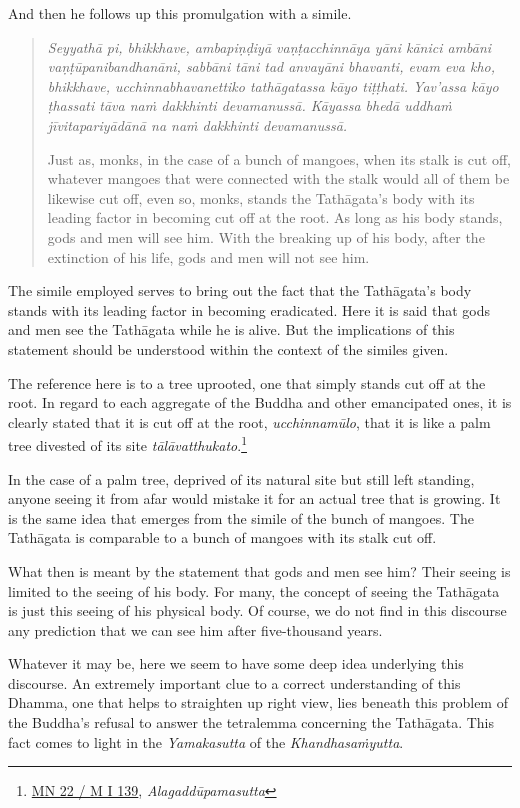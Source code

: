 And then he follows up this promulgation with a simile.

\begin{quote}
\emph{Seyyathā pi, bhikkhave, ambapiṇḍiyā vaṇṭacchinnāya yāni kānici ambāni vaṇṭūpanibandhanāni, sabbāni tāni tad anvayāni bhavanti, evam eva kho, bhikkhave, ucchinnabhavanettiko tathāgatassa kāyo tiṭṭhati. Yav'assa kāyo ṭhassati tāva naṁ dakkhinti devamanussā. Kāyassa bhedā uddhaṁ jīvitapariyādānā na naṁ dakkhinti devamanussā.}

Just as, monks, in the case of a bunch of mangoes, when its stalk is cut off, whatever mangoes that were connected with the stalk would all of them be likewise cut off, even so, monks, stands the Tathāgata's body with its leading factor in becoming cut off at the root. As long as his body stands, gods and men will see him. With the breaking up of his body, after the extinction of his life, gods and men will not see him.
\end{quote}

The simile employed serves to bring out the fact that the Tathāgata's body stands with its leading factor in becoming eradicated. Here it is said that gods and men see the Tathāgata while he is alive. But the implications of this statement should be understood within the context of the similes given.

The reference here is to a tree uprooted, one that simply stands cut off at the root. In regard to each aggregate of the Buddha and other emancipated ones, it is clearly stated that it is cut off at the root, \emph{ucchinnamūlo}, that it is like a palm tree divested of its site \emph{tālāvatthukato}.\footnote{\href{https://suttacentral.net/mn22/pli/ms}{MN 22 / M I 139}, \emph{Alagaddūpamasutta}}

In the case of a palm tree, deprived of its natural site but still left standing, anyone seeing it from afar would mistake it for an actual tree that is growing. It is the same idea that emerges from the simile of the bunch of mangoes. The Tathāgata is comparable to a bunch of mangoes with its stalk cut off.

What then is meant by the statement that gods and men see him? Their seeing is limited to the seeing of his body. For many, the concept of seeing the Tathāgata is just this seeing of his physical body. Of course, we do not find in this discourse any prediction that we can see him after five-thousand years.

Whatever it may be, here we seem to have some deep idea underlying this discourse. An extremely important clue to a correct understanding of this Dhamma, one that helps to straighten up right view, lies beneath this problem of the Buddha's refusal to answer the tetralemma concerning the Tathāgata. This fact comes to light in the \emph{Yamakasutta} of the \emph{Khandhasaṁyutta}.

